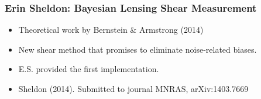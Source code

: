 \documentclass{beamer}
\begin{document}
%
%


\frame
{
    \frametitle{Erin Sheldon: Bayesian Lensing Shear Measurement}

    \begin{itemize}
        \item Theoretical work by Bernstein \& Armstrong (2014)
        \item New shear method that promises to eliminate noise-related biases.
        \item E.S. provided the first implementation.
        \item Sheldon (2014).  Submitted to journal MNRAS, arXiv:1403.7669
    \end{itemize}
}
\end{document}
